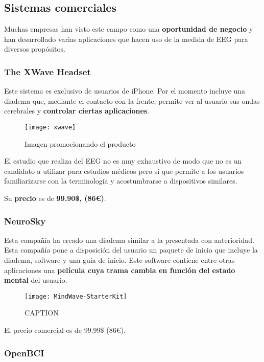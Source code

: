 \subsection{Sistemas comerciales\label{sec:Pro_empresa}}

Muchas empresas han visto este campo como una \textbf{oportunidad de negocio} y han desarrollado varias aplicaciones que hacen uso de la medida de \acrshort{EEG} para diversos propósitos.

\subsubsection{The XWave Headset}

Este sistema es exclusivo de usuarios de iPhone. Por el momento incluye una diadema que, mediante el contacto con la frente, permite ver al usuario sus ondas cerebrales y \textbf{controlar ciertas aplicaciones}.

\begin{figure} [h]
    \centering
    \texttt{[image: xwave]}
    \caption{Imagen promocionando el producto}
    \label{fig:xwave}
\end{figure}

El estudio que realiza del \acrshort{EEG} no es muy exhaustivo de modo que no es un candidato a utilizar para estudios médicos pero sí que permite a los usuarios familiarizarse con la terminología y acostumbrarse a dispositivos similares.

Su \textbf{precio} es de \textbf{99.90\$, (86€)}.

\subsubsection{NeuroSky}

Esta compañía ha creado una diadema similar a la presentada con anterioridad. Esta compañía pone a disposición del usuario un paquete de inicio que incluye la diadema, software y una guía de inicio. Este software contiene entre otras aplicaciones una \textbf{película cuya trama cambia en función del estado mental} del usuario.

\begin{figure} [h]
    \centering
    \texttt{[image: MindWave-StarterKit]}
    \caption{CAPTION}
    \label{fig:MindWave-StarterKit}
\end{figure}

El precio comercial es de 99.99\$ (86€).

\subsubsection{OpenBCI}

